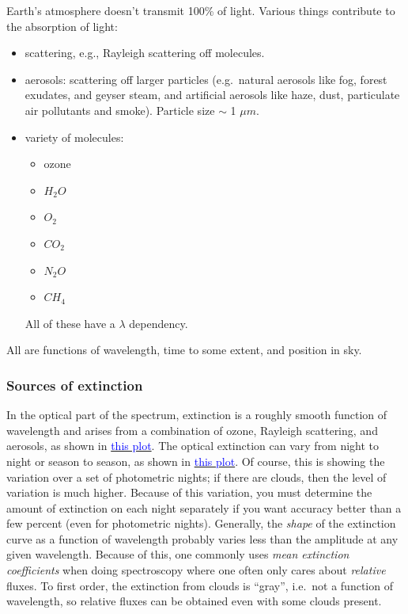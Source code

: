 \documentclass[12pt]{article}
\begin{document}
Earth's atmosphere doesn't transmit 100\% of light. Various things
contribute to the absorption of light:
\begin{itemize}
    \item scattering, e.g., Rayleigh scattering off molecules.
    \item aerosols: scattering off larger particles (e.g.\ natural
    aerosols like fog, forest exudates, and geyser steam, and
    artificial aerosols like haze, dust, particulate air pollutants
    and smoke). Particle size $\sim$ 1 $\mu m$.
    \item variety of molecules:
    \begin{itemize}
        \item ozone
        \item $H_2O$
        \item $O_2$
        \item $CO_2$
        \item $N_2O$
        \item $CH_4$
    \end{itemize}
    All of these have a $\lambda$ dependency.
\end{itemize}
All are functions of wavelength, time to some extent, and position in
sky.

\subsubsection{Sources of extinction}
In the optical part of the spectrum, extinction is a roughly smooth
function of wavelength and arises from a combination of ozone,
Rayleigh scattering, and aerosols, as shown in
\href{http://astronomy.nmsu.edu/holtz/a535/html/diagrams/a535/extinct.htm}
{\textcolor{blue}{this plot}}.
The optical extinction can vary from night to night
or season to season, as shown in
\href{http://astronomy.nmsu.edu/holtz/a535/html/diagrams/a535/tauvar.htm}
{\textcolor{blue}{this plot}}.
Of course, this is showing the variation over a set of
photometric nights; if there are clouds, then the level of variation
is much higher. Because of this variation, you must determine the
amount of extinction on each night separately if you want accuracy
better than a few percent (even for photometric nights). Generally,
the \emph{shape} of the extinction curve as a function of wavelength probably
varies less than the amplitude at any given wavelength. Because of
this, one commonly uses \emph{mean extinction coefficients} when doing
spectroscopy where one often only cares about \emph{relative} fluxes. To
first order, the extinction from clouds is ``gray'', i.e.\ not a
function of wavelength, so relative fluxes can be obtained even with
some clouds present.
\end{document}
